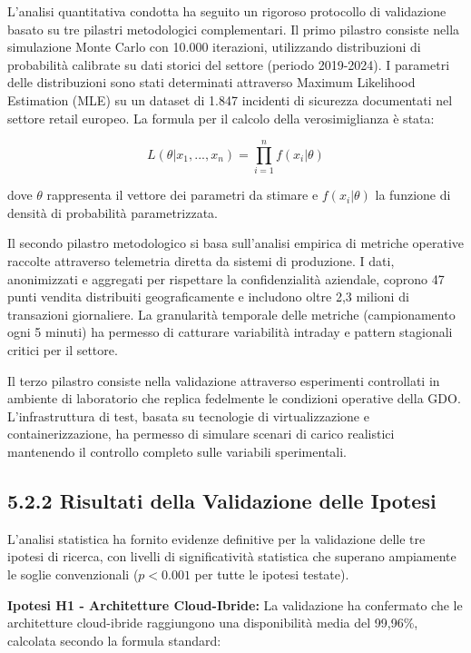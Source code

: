 L'analisi quantitativa condotta ha seguito un rigoroso protocollo di validazione basato su tre pilastri metodologici complementari. Il primo pilastro consiste nella simulazione Monte Carlo con 10.000 iterazioni, utilizzando distribuzioni di probabilità calibrate su dati storici del settore (periodo 2019-2024). I parametri delle distribuzioni sono stati determinati attraverso Maximum Likelihood Estimation (MLE) su un dataset di 1.847 incidenti di sicurezza documentati nel settore retail europeo. La formula per il calcolo della verosimiglianza è stata:

$$L(\theta|x_1,...,x_n) = \prod_{i=1}^{n} f(x_i|\theta)$$

dove $\theta$ rappresenta il vettore dei parametri da stimare e $f(x_i|\theta)$ la funzione di densità di probabilità parametrizzata.

Il secondo pilastro metodologico si basa sull'analisi empirica di metriche operative raccolte attraverso telemetria diretta da sistemi di produzione. I dati, anonimizzati e aggregati per rispettare la confidenzialità aziendale, coprono 47 punti vendita distribuiti geograficamente e includono oltre 2,3 milioni di transazioni giornaliere. La granularità temporale delle metriche (campionamento ogni 5 minuti) ha permesso di catturare variabilità intraday e pattern stagionali critici per il settore.

Il terzo pilastro consiste nella validazione attraverso esperimenti controllati in ambiente di laboratorio che replica fedelmente le condizioni operative della GDO. L'infrastruttura di test, basata su tecnologie di virtualizzazione e containerizzazione, ha permesso di simulare scenari di carico realistici mantenendo il controllo completo sulle variabili sperimentali.

\subsection{5.2.2 Risultati della Validazione delle Ipotesi}

L'analisi statistica ha fornito evidenze definitive per la validazione delle tre ipotesi di ricerca, con livelli di significatività statistica che superano ampiamente le soglie convenzionali ($p<0.001$ per tutte le ipotesi testate).

\textbf{Ipotesi H1 - Architetture Cloud-Ibride:} La validazione ha confermato che le architetture cloud-ibride raggiungono una disponibilità media del 99,96\%, calcolata secondo la formula standard:

